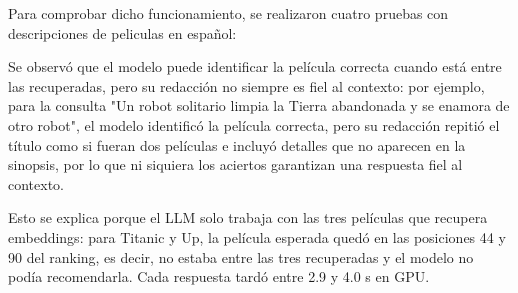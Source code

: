 Para comprobar dicho funcionamiento, se realizaron cuatro pruebas con descripciones de peliculas en español:

\begin{table}[htbp]
    \centering
    \caption{Resultados de la evaluación cualitativa del LLM.}
    \label{tab:resultados_llm}
\end{table}

Se observó que el modelo puede identificar la película correcta cuando está entre las recuperadas, pero su redacción no siempre es fiel al contexto: por ejemplo, para la consulta "Un robot solitario limpia la Tierra abandonada y se enamora de otro robot", el modelo identificó la película correcta, pero su redacción repitió el título como si fueran dos películas e incluyó detalles que no aparecen en la sinopsis, por lo que ni siquiera los aciertos garantizan una respuesta fiel al contexto. 

Esto se explica porque el LLM solo trabaja con las tres películas que recupera embeddings: para Titanic y Up, la película esperada quedó en las posiciones 44 y 90 del ranking, es decir, no estaba entre las tres recuperadas y el modelo no podía recomendarla. Cada respuesta tardó entre 2.9 y 4.0 s en GPU.

